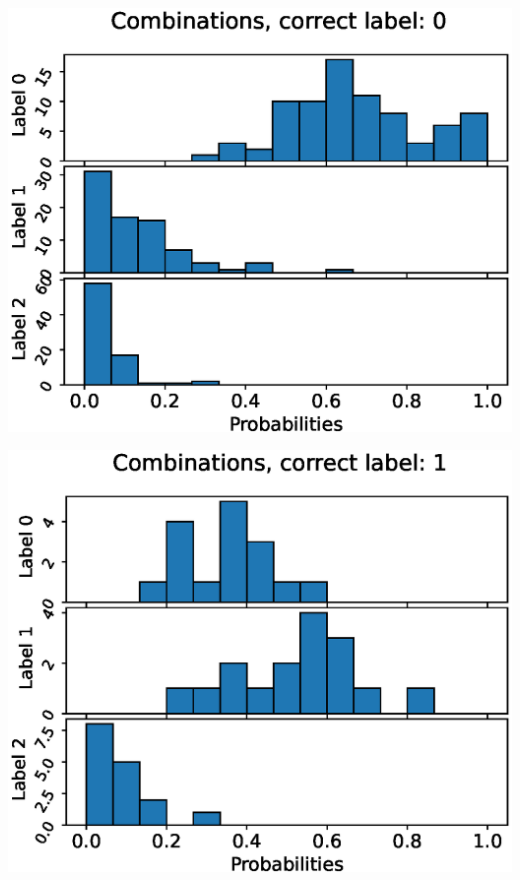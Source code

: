 \begin{center}
\begin{minipage}{0.33\textwidth}
  \includegraphics[width=\textwidth]{files/figs/app/hists/kmfp/c0.eps}
\end{minipage}%
\begin{minipage}{0.33\textwidth}
  \includegraphics[width=\textwidth]{files/figs/app/hists/kmfp/c1.eps}
\end{minipage}%
\begin{minipage}{0.33\textwidth}

\end{minipage}
\end{center}
